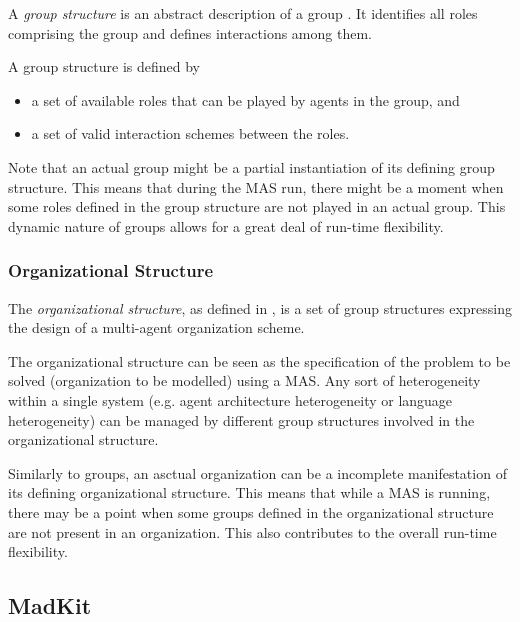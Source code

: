 A \textit{group structure} is an abstract description of a group \cite{Ferber97}.
It identifies all roles comprising the group and defines interactions among them.

A group structure is defined by
\begin{itemize}
	\item a set of available roles that can be played by agents in the group, and
	\item a set of valid interaction schemes between the roles.
\end{itemize}

Note that an actual group might be a partial instantiation of its defining group structure.
This means that during the MAS run, there might be a moment when some roles defined in the group structure are not played in an actual group.
This dynamic nature of groups allows for a great deal of run-time flexibility.

\subsubsection*{Organizational Structure}

The \textit{organizational structure}, as defined in \cite{Ferber97}, is a set of group structures expressing the design of a multi-agent organization scheme.

The organizational structure can be seen as the specification of the problem to be solved (organization to be modelled) using a MAS.
Any sort of heterogeneity within a single system (e.g. agent architecture heterogeneity or language heterogeneity) can be managed by different group structures involved in the organizational structure.

Similarly to groups, an asctual organization can be a incomplete manifestation of its defining organizational structure.
This means that while a MAS is running, there may be a point when some groups defined in the organizational structure are not present in an organization.
This also contributes to the overall run-time flexibility.

\subsection{MadKit}

